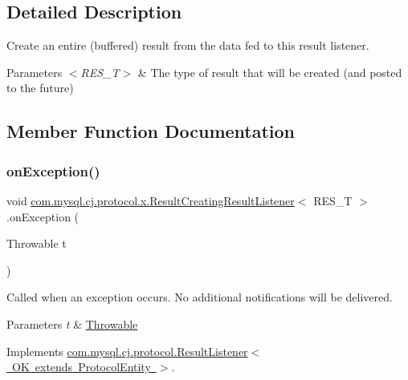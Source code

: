 \subsection{Detailed Description}
Create an entire (buffered) result from the data fed to this result listener.


\begin{DoxyParams}{Parameters}
{\em $<$\+R\+E\+S\+\_\+\+T$>$} & The type of result that will be created (and posted to the future) \\
\hline
\end{DoxyParams}


\subsection{Member Function Documentation}
\mbox{\label{classcom_1_1mysql_1_1cj_1_1protocol_1_1x_1_1_result_creating_result_listener_af44c32d4ea694aea93998ebbba341605}} 
\subsubsection{\texorpdfstring{on\+Exception()}{onException()}}
{\footnotesize\ttfamily void \mbox{\hyperlink{classcom_1_1mysql_1_1cj_1_1protocol_1_1x_1_1_result_creating_result_listener}{com.\+mysql.\+cj.\+protocol.\+x.\+Result\+Creating\+Result\+Listener}}$<$ R\+E\+S\+\_\+T $>$.on\+Exception (\begin{DoxyParamCaption}\item[{Throwable}]{t }\end{DoxyParamCaption})}

Called when an exception occurs. No additional notifications will be delivered.


\begin{DoxyParams}{Parameters}
{\em t} & \mbox{\hyperlink{}{Throwable}} \\
\hline
\end{DoxyParams}


Implements \mbox{\hyperlink{interfacecom_1_1mysql_1_1cj_1_1protocol_1_1_result_listener_ab3ea59c10a6ea7cba54923bc4237dddc}{com.\+mysql.\+cj.\+protocol.\+Result\+Listener$<$ O\+K extends Protocol\+Entity $>$}}.

